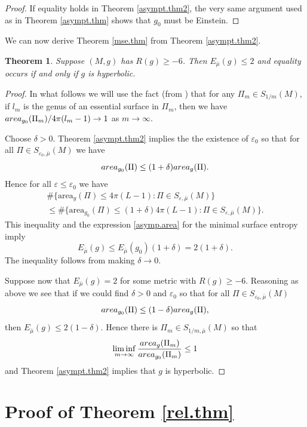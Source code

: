 \documentclass[11pt]{amsart}
\newtheorem{thm}{Theorem}[section]
\theoremstyle{remark}
\theoremstyle{definition}
\begin{document}
{{\begin{proof}
		If equality holds in Theorem \ref{asympt.thm2}, the very same argument used as in Theorem \ref{asympt.thm} shows that $g_0$ must be Einstein.
	\end{proof}
	
	We can now derive Theorem \ref{mse.thm} from Theorem \ref{asympt.thm2}.
	\begin{thm}
		Suppose $(M,g)$ has $R(g)\geq -6$. Then ${E_{\bar\mu}(g)}\leq 2$ and equality occurs if and only if $g$ is hyperbolic.
	\end{thm}
	\begin{proof} In what follows we will use the fact (from \cite{seppi}) that for any $\Pi_m\in S_{1/m}(M)$, if $l_m$ is the genus of an essential surface in $\Pi_m$, then we have ${\rm area}_{g_0}(\Pi_m)/{4\pi(l_m-1)}\to 1$ as $m\to\infty$.
		
		Choose $\delta>0$. Theorem \ref{asympt.thm2}   implies the the existence of $\varepsilon_0$ so that for all $\Pi\in {S_{\varepsilon_0,\bar\mu}(M)}$  we  have
		$${\rm area}_{g_0}(\Pi)\leq(1+\delta){\rm area}_g(\Pi).$$
		Hence for all $\varepsilon\leq \varepsilon_0$ we have
		\begin{multline*}
			\#\{\text{area}_g(\Pi)\leq 4\pi(L-1):\Pi\in {S_{\varepsilon,\bar\mu}(M)}\}\\
			\leq \#\{\text{area}_{g_0}(\Pi)\leq (1+\delta)4\pi(L-1):\Pi\in {S_{\varepsilon,\bar\mu}(M)}\}.
		\end{multline*}
		This inequality and the expression \eqref{asymp.area} for the minimal surface entropy imply
		$${E_{\bar\mu}(g)\leq E_{\bar\mu}(g_0)(1+\delta)}=2(1+\delta).$$
		The inequality follows from making $\delta\to 0$. 
		
		Suppose now that ${E_{\bar\mu}(g)}=2$ for some metric with $R(g)\geq -6$. Reasoning as above we see that if we could find $\delta>0$ and $\varepsilon_0$ so that 
		for all $\Pi\in {S_{\varepsilon_0,\bar\mu}(M)}$
		$${\rm area}_{g_0}(\Pi)\leq (1-\delta){\rm area}_g(\Pi),$$
		then ${E_{\bar\mu}(g)}\leq 2(1-\delta)$.  Hence there is $\Pi_m\in {S_{1/m,\bar\mu}(M)}$ so that 
		$$\liminf_{m\to\infty}\frac{{\rm area}_g(\Pi_m)}{{\rm area}_{g_0}(\Pi_m)}\leq 1$$
		and Theorem \ref{asympt.thm2} implies that $g$ is hyperbolic.
	\end{proof}
	
	\section{Proof of Theorem \ref{rel.thm}}
	
	
	
}}
\end{document}

